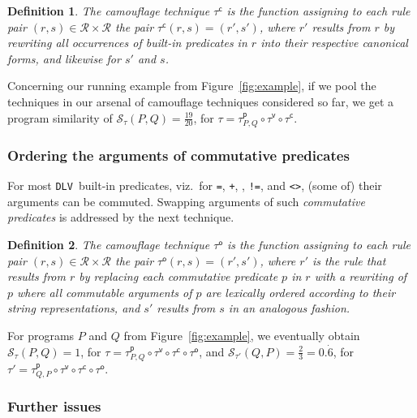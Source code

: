 \documentclass{tlp}
\newcommand{\dlv}{\texttt{DLV}\xspace}
\newcommand{\camouv}{\tau^\mathsf{v}}
\newcommand{\camoup}{\tau^\mathsf{p}}
\newcommand{\camouc}{\tau^\mathsf{c}}
\newcommand{\camouo}{\tau^\mathsf{o}}
\newcommand{\rules}{\mathcal{R}}
\newcommand{\progsim}[3]{\mathcal{S}_{#3}({#1},{#2})}
\newtheorem{definition}{Definition}
\begin{document}
\begin{definition}\label{def:canonisation}
The camouflage technique $\camouc$ is the function assigning to each rule pair $(r,s) \in \rules\times\rules$ the pair $\camouc(r, s) = (r', s')$,
where $r'$ results from $r$ by rewriting all occurrences of built-in predicates in $r$ into their respective canonical forms, and likewise for $s'$ and $s$.
\end{definition}

Concerning our running example from Figure~\ref{fig:example},
if we pool the techniques in our  arsenal of camouflage techniques considered so far, we get a program similarity of
$\progsim{P}{Q}{\tau} = \frac{19}{20}$, for $\tau = \camoup_{P,Q} \circ \camouv \circ \camouc$.

\subsubsection{Ordering the arguments of commutative predicates}
For most \dlv\ built-in predicates, viz.\ for {\tt =}, {\tt +}, {\tt *}, 
{\tt !=}, and {\tt <>}, (some of) their arguments can be commuted. 
Swapping arguments of such \emph{commutative predicates} is addressed by the  next technique.

\begin{definition}\label{def:swapping}
The camouflage technique $\camouo$ is the function assigning to each rule pair $(r,s) \in \rules\times\rules$ the pair
$\camouo(r, s) = (r', s')$,
where $r'$  is the rule that results from $r$  by replacing each commutative predicate $p$ in $r$
 with  a rewriting of $p$ where all commutable arguments of $p$ are lexically ordered according to their
string representations, and $s'$ results from $s$ in an analogous fashion. 
\end{definition}
 
For programs $P$ and $Q$ from  Figure~\ref{fig:example},
we eventually obtain $\progsim{P}{Q}{\tau} = 1$, for $\tau = \camoup_{P,Q} \circ \camouv \circ \camouc \circ \camouo$,
and  $\progsim{Q}{P}{\tau'} = \frac{2}{3}=0.\dot{6}$, for $\tau' = \camoup_{Q,P} \circ \camouv \circ \camouc \circ \camouo$.

\subsubsection{Further issues}
\end{document}
